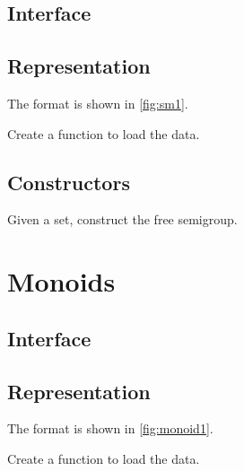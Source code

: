 \subsection*{Interface}



\subsection*{Representation}

The format is shown in \cref{fig:sm1}.


\begin{exercise}[Representation]
  Create a function to load the data.



\end{exercise}

\subsection*{Constructors}

\begin{exercise}
  Given a set, construct the free semigroup.

\end{exercise}


\section{Monoids}

\subsection*{Interface}



\subsection*{Representation}

The format is shown in \cref{fig:monoid1}.



\begin{exercise}[Representation]
  Create a function to load the data.


%

\end{exercise}


